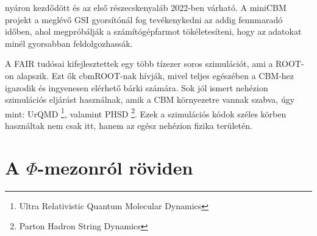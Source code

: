 \documentclass[a4paper,12pt]{article}
\begin{document}
nyáron kezdődött és az első részecskenyaláb 2022-ben várható. A miniCBM projekt a meglévő GSI gyorsítónál fog tevékenykedni az addig fennmaradó
időben, ahol megpróbálják a számítógépfarmot tökéletesíteni, hogy az adatokat minél gyorsabban feldolgozhassák.
\vspace{5mm}
\par A FAIR tudósai kifejlesztettek egy több tízezer soros szimulációt, ami a ROOT-on alapszik. Ezt ők cbmROOT-nak hívják, mivel teljes
egészében a CBM-hez igazodik és ingyenesen elérhető bárki számára. Sok jól ismert nehézion szimulációs eljárást használnak, amik a CBM
környezetre vannak szabva, úgy mint: UrQMD \footnote{ Ultra Relativistic Quantum Molecular Dynamics }, valamint  PHSD \footnote{ Parton Hadron String Dynamics }.
 Ezek a szimulációs kódok széles körben használtak nem csak itt, hanem az egész nehézion fizika területén. 
\section{ A $\Phi$-mezonról röviden}
\end{document}
